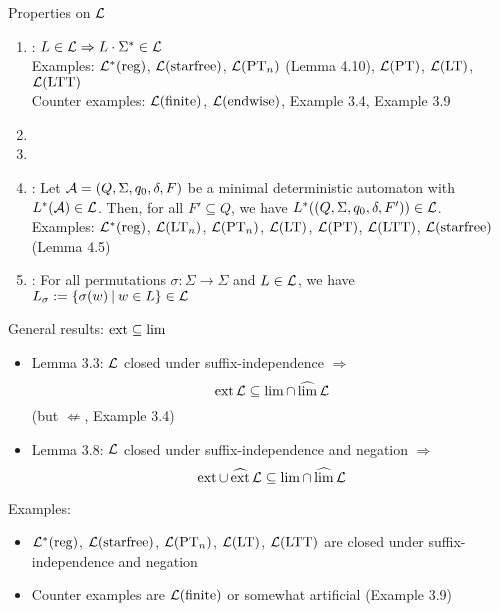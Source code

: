 \documentclass[
	notheorems,noamsthm]{beamer}
\begin{document}
\begin{frame}[<+->]{Properties on $\mathcal{L}$}
\begin{enumerate}
\item {}: $L \in \mathcal{L} \Rightarrow L \cdot \Sigma^* \in \mathcal{L}$ \\
Examples: $\mathcal{L}^*(\textup{\textrm{reg}})$, $\mathcal{L}(\textup{\textrm{starfree}})$, $\mathcal{L}(\textup{\textrm{PT}}_n)$ (Lemma 4.10), $\mathcal{L}(\textup{\textrm{PT}})$, $\mathcal{L}(\textup{\textrm{LT}})$, $\mathcal{L}(\textup{\textrm{LTT}})$ \\
Counter examples: $\mathcal{L}(\textup{\textrm{finite}})$, $\mathcal{L}(\textup{\textrm{endwise}})$, Example 3.4, Example 3.9
\item {}
\item {}
\item {}:
Let $\mathcal{A} = (Q,\Sigma,q_0,\delta,F)$ be a minimal deterministic automaton with $L^*(\mathcal{A}) \in \mathcal{L}$. Then, for all $F' \subseteq Q$, we have $L^*((Q,\Sigma,q_0,\delta,F')) \in \mathcal{L}$. \\
Examples: $\mathcal{L}^*(\textup{\textrm{reg}})$, $\mathcal{L}(\textup{\textrm{LT}}_n)$, $\mathcal{L}(\textup{\textrm{PT}}_n)$, $\mathcal{L}(\textup{\textrm{LT}})$, $\mathcal{L}(\textup{\textrm{PT}})$, $\mathcal{L}(\textup{\textrm{LTT}})$, $\mathcal{L}(\textup{\textrm{starfree}})$ (Lemma 4.5)
\item {}: For all permutations $\sigma \colon \Sigma \rightarrow \Sigma$ and $L \in \mathcal{L}$, we have $L_\sigma := \Set{\sigma(w)}{w \in L} \in \Lang$
\end{enumerate}
\end{frame}

\begin{frame}[<+->]{General results: $\operatorname{ext} \subseteq \lim$}
\begin{itemize}
\item Lemma 3.3: $\mathcal{L}$ closed under suffix-independence $\Rightarrow$
\[ \operatorname{ext} \mathcal{L} \subseteq \lim \cap \operatorname{\widehat{lim}} \mathcal{L} \]
(but $\not\Leftarrow$, Example 3.4)
\item Lemma 3.8: $\mathcal{L}$ closed under suffix-independence and negation $\Rightarrow$
\[ \operatorname{ext} \cup \operatorname{\widehat{ext}} \mathcal{L} \subseteq \lim \cap \operatorname{\widehat{lim}} \mathcal{L} \]
\end{itemize}
Examples:
\begin{itemize}
\item $\mathcal{L}^*(\textup{\textrm{reg}})$, $\mathcal{L}(\textup{\textrm{starfree}})$, $\mathcal{L}(\textup{\textrm{PT}}_n)$, $\mathcal{L}(\textup{\textrm{LT}})$, $\mathcal{L}(\textup{\textrm{LTT}})$ are closed under suffix-independence and negation
\item Counter examples are $\mathcal{L}(\textup{\textrm{finite}})$ or somewhat artificial (Example 3.9)
\end{itemize}
\end{frame}
\end{document}
